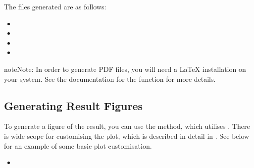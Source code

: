 \documentclass[letterpaper,10pt,english]{sphinxmanual}
\begin{document}
\sphinxAtStartPar
The files generated are as follows:
\begin{itemize}
\item {} 
\sphinxAtStartPar
{}

\item {} 
\sphinxAtStartPar
{}

\item {} 
\sphinxAtStartPar
{}

\item {} 
\sphinxAtStartPar
{}

\end{itemize}

\begin{sphinxadmonition}{note}{Note:}
\sphinxAtStartPar
In order to generate PDF files, you will need a LaTeX installation on
your system. See the documentation for the
{\hyperref[\detokenize{references/write:nmrespy.write.write_result}]{}} function for more details.
\end{sphinxadmonition}


\subsection{Generating Result Figures}
\label{\detokenize{walkthrough:generating-result-figures}}
\sphinxAtStartPar
To generate a figure of the result, you can use the
{\hyperref[\detokenize{references/core:nmrespy.core.Estimator.plot_result}]{}} method, which utilises
. There is wide scope for customising
the plot, which is described in detail in
{\hyperref[\detokenize{misc/figure_customisation::doc}]{}}.
See {\hyperref[\detokenize{walkthrough:summary}]{}} below for an example of some basic plot customisation.

\begin{sphinxVerbatim}[commandchars=\\\{\}]
  
\end{sphinxVerbatim}
\begin{itemize}
\item {} 
\sphinxAtStartPar
{}

\end{itemize}
\end{document}
